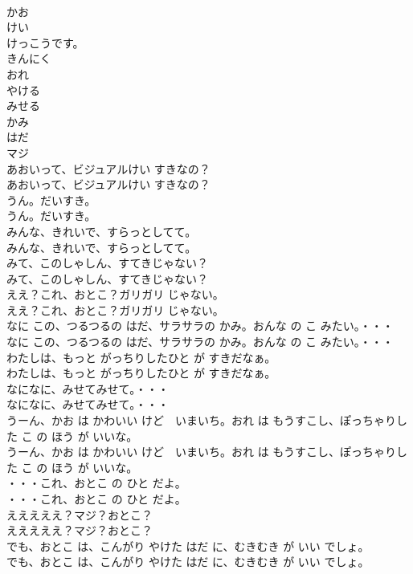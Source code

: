 \documentclass[8pt]{extreport}
\begin{document}
\begin{CJK}{UTF8}{min}
\\	かお
\\	けい
\\	けっこうです。
\\	きんにく
\\	おれ
\\	やける
\\	みせる
\\	かみ
\\	はだ
\\	マジ
\\	あおいって、ビジュアルけい すきなの？	
\\	あおいって、ビジュアルけい すきなの？ 
\\	うん。だいすき。	
\\	うん。だいすき。 
\\	みんな、きれいで、すらっとしてて。	
\\	みんな、きれいで、すらっとしてて。 
\\	みて、このしゃしん、すてきじゃない？	
\\	みて、このしゃしん、すてきじゃない？ 
\\	ええ？これ、おとこ？ガリガリ じゃない。	
\\	ええ？これ、おとこ？ガリガリ じゃない。 
\\	なに この、つるつるの はだ、サラサラの かみ。おんな の こ みたい。・・・	
\\	なに この、つるつるの はだ、サラサラの かみ。おんな の こ みたい。・・・ 
\\	わたしは、もっと がっちりしたひと が すきだなぁ。	
\\	わたしは、もっと がっちりしたひと が すきだなぁ。 
\\	なになに、みせてみせて。・・・	
\\	なになに、みせてみせて。・・・ 
\\	うーん、かお は かわいい けど　いまいち。おれ は もうすこし、ぽっちゃりした こ の ほう が いいな。	
\\	うーん、かお は かわいい けど　いまいち。おれ は もうすこし、ぽっちゃりした こ の ほう が いいな。 
\\	・・・これ、おとこ の ひと だよ。	
\\	・・・これ、おとこ の ひと だよ。 
\\	えええええ？マジ？おとこ？	
\\	えええええ？マジ？おとこ？ 
\\	でも、おとこ は、こんがり やけた はだ に、むきむき が いい でしょ。	
\\	でも、おとこ は、こんがり やけた はだ に、むきむき が いい でしょ。 

\end{CJK}
\end{document}
